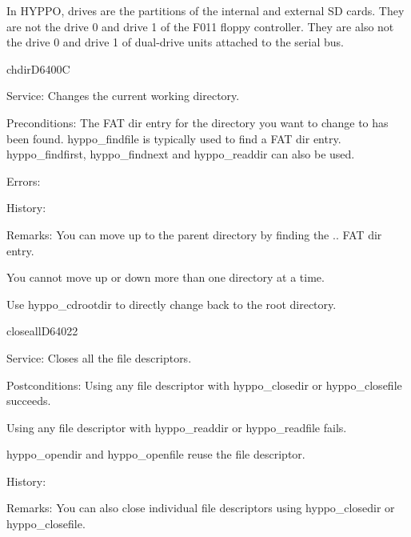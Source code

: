 In HYPPO, drives are the partitions of the internal and external SD cards.
They are not the drive 0 and drive 1 of the F011 floppy controller. They
are also not the drive 0 and drive 1 of dual-drive units attached to the serial
bus.


\begin{hyppotrap}{chdir}{D640}{0C}
\item [Service:]
  Changes the current working directory.
\item [Preconditions:]
  The FAT dir entry for the directory you want to change to has been
  found. hyppo\_findfile is typically used to find a FAT dir entry.
  hyppo\_findfirst, hyppo\_findnext and hyppo\_readdir can also be used.
\item [Errors:]
\item [History:]
\item [Remarks:]
  You can move up to the parent directory by finding the .. FAT dir entry.

  You cannot move up or down more than one directory at a time.

  Use hyppo\_cdrootdir to directly change back to the root directory.
\end{hyppotrap}


\newpage
\begin{hyppotrap}{closeall}{D640}{22}
\item [Service:]
  Closes all the file descriptors.
\item [Postconditions:]
  Using any file descriptor with hyppo\_closedir or hyppo\_closefile succeeds.

  Using any file descriptor with hyppo\_readdir or hyppo\_readfile fails.

  hyppo\_opendir and hyppo\_openfile reuse the file descriptor.
\item [History:]
\item [Remarks:]
  You can also close individual file descriptors using hyppo\_closedir or
  hyppo\_closefile.
\end{hyppotrap}


